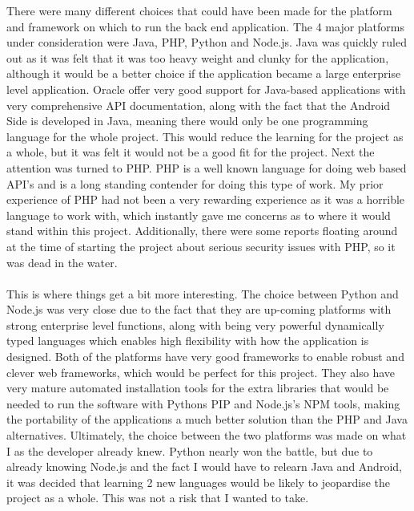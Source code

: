 There were many different choices that could have been made for the platform and framework on which to run the back end application. The 4 major platforms under consideration were Java, PHP, Python and Node.js. Java was quickly ruled out as it was felt that it was too heavy weight and clunky for the application, although it would be a better choice if the application became a large enterprise level application. Oracle offer very good support for Java-based applications with very comprehensive API documentation, along with the fact that the Android Side is developed in Java, meaning there would only be one programming language for the whole project. This would reduce the learning for the project as a whole, but it was felt it would not be a good fit for the project. Next the attention was turned to PHP. PHP is a well known language for doing web based API's and is a long standing contender for doing this type of work. My prior experience of PHP had not been a very rewarding experience as it was a horrible language to work with, which instantly gave me concerns as to where it would stand within this project. Additionally, there were some reports floating around at the time of starting the project about serious security issues with PHP, so it was dead in the water.\\
\\
This is where things get a bit more interesting. The choice between Python and Node.js was very close due to the fact that they are up-coming platforms with strong enterprise level functions, along with being very powerful dynamically typed languages which enables high flexibility with how the application is designed. Both of the platforms have very good frameworks to enable robust and clever web frameworks, which would be perfect for this project. They also have very mature automated installation tools for the extra libraries that would be needed to run the software with Pythons PIP and Node.js's NPM tools, making the portability of the applications a much better solution than the PHP and Java alternatives. Ultimately, the choice between the two platforms was made on what I as the developer already knew. Python nearly won the battle, but due to already knowing Node.js and the fact I would have to relearn Java and Android, it was decided that learning 2 new languages would be likely to jeopardise the project as a whole. This was not a risk that I wanted to take.\\
\\

